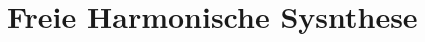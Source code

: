 \subsection{}


\section{Freie Harmonische Sysnthese}
\label{sec:3}


\subsection{}


\subsection{}


